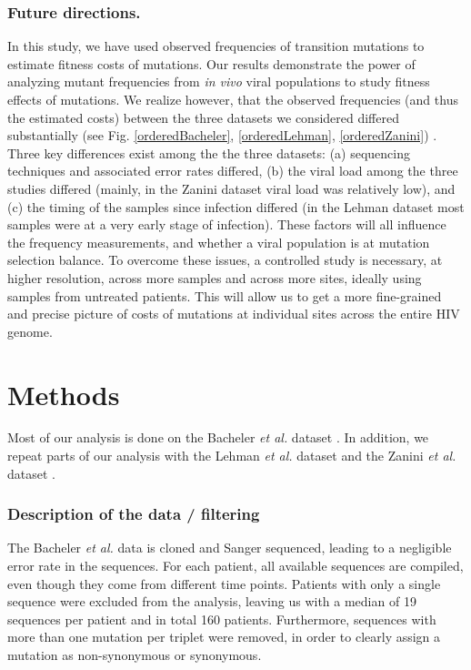 \documentclass{article}
\begin{document}
\subsubsection*{Future directions.}
In this study, we have used observed frequencies of transition mutations to estimate fitness costs of mutations. 
Our results demonstrate the power of analyzing mutant frequencies from \textit {in vivo} viral populations to study fitness effects of mutations. We realize however, that the observed frequencies (and thus the estimated costs) between the three datasets we considered differed substantially (see Fig. \ref{orderedBacheler}, \ref{orderedLehman}, \ref{orderedZanini})
\cite{bacheler2000human, zanini2016population, lehman2015risk}. Three key differences exist among the the three datasets: (a) sequencing techniques and associated error rates differed, (b) the viral load among the three studies differed (mainly, in the Zanini dataset viral load was relatively low), and (c) the timing of the samples since infection differed (in the Lehman dataset most samples were at a very early stage of infection). These factors will all influence the frequency measurements, and whether a viral population is at mutation selection balance.
To overcome these issues, a controlled study is necessary, at higher resolution, across more samples and across more sites, ideally using samples from untreated patients. This will allow us to get a more fine-grained and precise picture of costs of mutations at individual sites across the entire HIV genome. 

\pagebreak
\section{Methods}

Most of our analysis is done on the Bacheler \textit {et al.} dataset \cite{bacheler2000human}. 
In addition, we repeat parts of our analysis with the Lehman \textit {et al.} dataset \cite{lehman2015risk} and the Zanini \textit {et al.} dataset \cite{zanini2016population}. 

\subsubsection*{Description of the data / filtering}
The Bacheler \textit {et al.} data \cite{bacheler2000human} is cloned and Sanger sequenced, leading to a negligible error rate in the sequences. For each patient, all available sequences are compiled, even though they come from different time points. Patients with only a single sequence were excluded from the analysis, leaving us with a median of 19 sequences per patient and in total 160 patients.
Furthermore, sequences with more than one mutation per triplet were removed, in order to clearly assign a mutation as non-synonymous or synonymous. 
\end{document}
